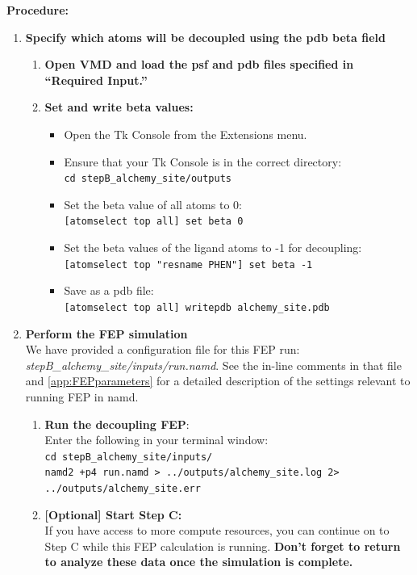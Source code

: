 \documentclass[9pt,tutorial]{Styling/livecoms}
\newcommand{\filepath}[1]{\textit{#1}}
\newcommand{\textInput}[1]{\texttt{#1}}
\begin{document}
\noindent\textbf{Procedure:}
\begin{enumerate}
    \item \textbf{Specify which atoms will be decoupled using the pdb beta field}\label{step:makeFEPpdbSite} 
        \begin{enumerate}[label=\alph*., ref=\theenumi.\alph*]
            \item \textbf{Open VMD and load the psf and pdb files specified in ``Required Input.''}
            \item \textbf{Set and write beta values:}
            \begin{itemize}
                \item Open the Tk Console from the Extensions menu.
                \item Ensure that your Tk Console is in the correct directory:\\
                \textInput{cd stepB\_alchemy\_site/outputs}
                \item Set the beta value of all atoms to 0:\\
                \textInput{[atomselect top all] set beta 0}
                \item Set the beta values of the ligand atoms to -1 for decoupling:\\
                \textInput{[atomselect top "resname PHEN"] set beta -1}
                \item Save as a pdb file:\\
                \textInput{[atomselect top all] writepdb alchemy\_site.pdb}
            \end{itemize}
        \end{enumerate}

    \item \textbf{Perform the FEP simulation}\\
    We have provided a configuration file for this FEP run: \filepath{stepB\_alchemy\_site/inputs/run.namd}. See the in-line comments in that file and \ref{app:FEPparameters} for a detailed description of the settings relevant to running FEP in namd.
    \begin{enumerate}[label=\alph*., ref=\theenumi.\alph*]     
         \item \textbf{Run the decoupling FEP}:\\
         Enter the following in your terminal window:\\
            \textInput{cd stepB\_alchemy\_site/inputs/}\\
            \textInput{namd2 +p4 run.namd > ../outputs/alchemy\_site.log 2> ../outputs/alchemy\_site.err}
        \item \textbf{[Optional] Start Step C:}\\
        If you have access to more compute resources, you can continue on to Step C while this FEP calculation is running. \textbf{Don't forget to return to analyze these data once the simulation is complete.} 
    \end{enumerate}
    

\end{enumerate}
\end{document}
